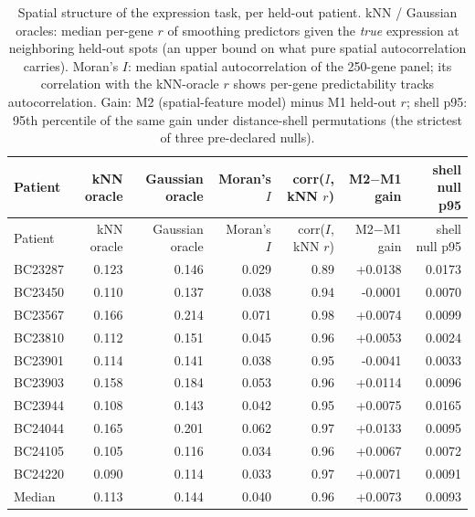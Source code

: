 \begin{longtable}{lrrrrrr}
\caption{Spatial structure of the expression task, per held-out patient. kNN / Gaussian
oracles: median per-gene $r$ of smoothing predictors given the \emph{true} expression at
neighboring held-out spots (an upper bound on what pure spatial autocorrelation carries).
Moran's $I$: median spatial autocorrelation of the 250-gene panel; its correlation with the
kNN-oracle $r$ shows per-gene predictability tracks autocorrelation. Gain: M2 (spatial-feature
model) minus M1 held-out $r$; shell p95: 95th percentile of the same gain under distance-shell
permutations (the strictest of three pre-declared nulls).}\label{tab:spatial-baselines}\\
\toprule
Patient & kNN oracle & Gaussian oracle & Moran's $I$ & corr($I$, kNN $r$) & M2$-$M1 gain & shell null p95 \\
\midrule
\endfirsthead
\toprule
Patient & kNN oracle & Gaussian oracle & Moran's $I$ & corr($I$, kNN $r$) & M2$-$M1 gain & shell null p95 \\
\midrule
\endhead
BC23287 & 0.123 & 0.146 & 0.029 & 0.89 & +0.0138 & 0.0173 \\
BC23450 & 0.110 & 0.137 & 0.038 & 0.94 & -0.0001 & 0.0070 \\
BC23567 & 0.166 & 0.214 & 0.071 & 0.98 & +0.0074 & 0.0099 \\
BC23810 & 0.112 & 0.151 & 0.045 & 0.96 & +0.0053 & 0.0024 \\
BC23901 & 0.114 & 0.141 & 0.038 & 0.95 & -0.0041 & 0.0033 \\
BC23903 & 0.158 & 0.184 & 0.053 & 0.96 & +0.0114 & 0.0096 \\
BC23944 & 0.108 & 0.143 & 0.042 & 0.95 & +0.0075 & 0.0165 \\
BC24044 & 0.165 & 0.201 & 0.062 & 0.97 & +0.0133 & 0.0095 \\
BC24105 & 0.105 & 0.116 & 0.034 & 0.96 & +0.0067 & 0.0072 \\
BC24220 & 0.090 & 0.114 & 0.033 & 0.97 & +0.0071 & 0.0091 \\
\midrule
Median & 0.113 & 0.144 & 0.040 & 0.96 & +0.0073 & 0.0093 \\
\bottomrule
\end{longtable}
